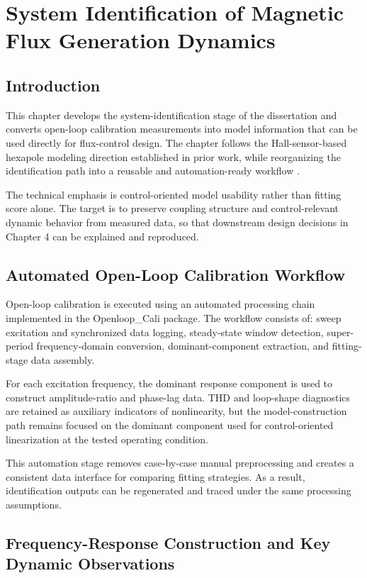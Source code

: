 \chapter{System Identification of Magnetic Flux Generation Dynamics}

\section{Introduction}

This chapter develops the system-identification stage of the dissertation and converts open-loop calibration measurements into model information that can be used directly for flux-control design. The chapter follows the Hall-sensor-based hexapole modeling direction established in prior work, while reorganizing the identification path into a reusable and automation-ready workflow \cite{long2022hallsensor,meng2024piconewton}.

The technical emphasis is control-oriented model usability rather than fitting score alone. The target is to preserve coupling structure and control-relevant dynamic behavior from measured data, so that downstream design decisions in Chapter 4 can be explained and reproduced.

\section{Automated Open-Loop Calibration Workflow}

Open-loop calibration is executed using an automated processing chain implemented in the Openloop\_Cali package. The workflow consists of: sweep excitation and synchronized data logging, steady-state window detection, super-period frequency-domain conversion, dominant-component extraction, and fitting-stage data assembly.

For each excitation frequency, the dominant response component is used to construct amplitude-ratio and phase-lag data. THD and loop-shape diagnostics are retained as auxiliary indicators of nonlinearity, but the model-construction path remains focused on the dominant component used for control-oriented linearization at the tested operating condition.

This automation stage removes case-by-case manual preprocessing and creates a consistent data interface for comparing fitting strategies. As a result, identification outputs can be regenerated and traced under the same processing assumptions.

\section{Frequency-Response Construction and Key Dynamic Observations}

